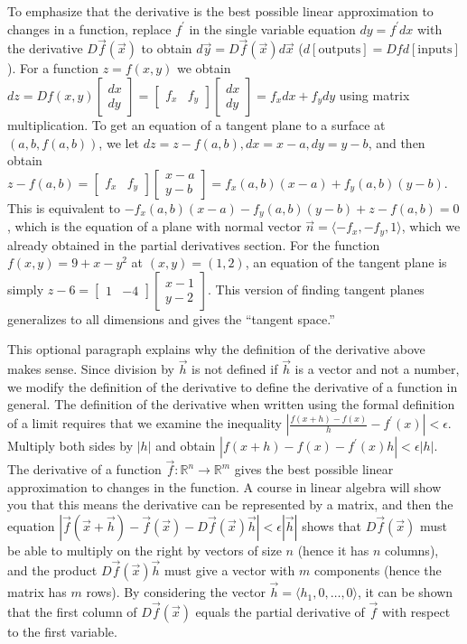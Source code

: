 To emphasize that the derivative is the best possible linear
approximation to changes in a function, replace $f^\prime$ in the single
variable equation $dy=f^\prime dx$ with the derivative $D\vec f(\vec x)$ to
obtain $d\vec y =D\vec f(\vec x)d\vec x$ ($d[\text{outputs}]=Df
d[\text{inputs}]$).  For a function $z=f(x,y)$ we obtain
$dz=Df(x,y)\begin{bmatrix}dx\\dy\end{bmatrix} =
\begin{bmatrix}f_x&f_y\end{bmatrix}\begin{bmatrix}dx\\dy\end{bmatrix}
= f_xdx+f_ydy$ using matrix multiplication. To get an equation of a
tangent plane to a surface at $(a,b,f(a,b))$, we let $dz=z-f(a,b),
dx=x-a,dy=y-b$, and then obtain $z-f(a,b) =
\begin{bmatrix}f_x&f_y\end{bmatrix}\begin{bmatrix}x-a\\y-b\end{bmatrix}=f_x(a,b)
(x-a)+f_y(a,b)(y-b)$. This is equivalent to  $-f_x(a,b)
(x-a)-f_y(a,b)(y-b)+z-f(a,b)=0$, which is the equation of a plane with
normal vector $\vec n=\langle-f_x,-f_y,1\rangle$, which we already
obtained in the partial derivatives section. For the function
$f(x,y)=9+x-y^2$ at $(x,y)=(1,2)$, an equation of the tangent plane is
simply  $z-6 =
\begin{bmatrix}1&-4\end{bmatrix}\begin{bmatrix}x-1\\y-2\end{bmatrix}$. 
This version of finding tangent planes generalizes to all dimensions
and gives the ``tangent space.''

This optional paragraph explains why the definition of the derivative
above makes sense. Since division by $\vec h$ is not defined if $\vec
h$ is a vector and not a number, we modify the definition of the
derivative to define the derivative of a function in general. The
definition of the derivative when written using the formal definition
of a limit requires that we examine the inequality
$|\frac{f(x+h)-f(x)}{h} - f^\prime(x)|<\epsilon$.  Multiply both sides by $|h|$
and obtain $|f(x+h)-f(x) - f^\prime(x)h|<\epsilon|h|$. The derivative of a
function $\vec f:\mathbb{R}^n\to\mathbb{R}^m$ gives the best possible
linear approximation to changes in the function. A course in linear
algebra will show you that this means the derivative can be
represented by a matrix, and then the equation $|\vec f(\vec x+\vec
h)-\vec f(\vec x) - D\vec f(\vec x)\vec h|<\epsilon|\vec h|$ shows that
$D\vec f(\vec x)$ must be able to multiply on the right by vectors of
size $n$ (hence it has $n$ columns), and the product $D\vec f(\vec
x)\vec h$ must give a vector with $m$ components (hence the matrix has
$m$ rows). By considering the vector $\vec h =
\langle h_1,0,\ldots,0\rangle$, it can be shown that the first column of
$D\vec f(\vec x)$ equals the partial derivative of $\vec f$ with
respect to the first variable. 
 
